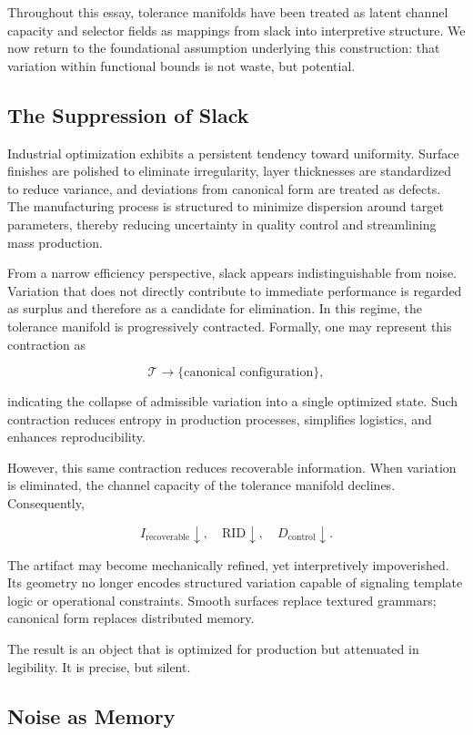 \documentclass[11pt]{article}
\begin{document}
Throughout this essay, tolerance manifolds have been treated as
latent channel capacity and selector fields as mappings from slack
into interpretive structure. We now return to the foundational
assumption underlying this construction: that variation within
functional bounds is not waste, but potential.

\subsection{The Suppression of Slack}

Industrial optimization exhibits a persistent tendency toward
uniformity. Surface finishes are polished to eliminate irregularity,
layer thicknesses are standardized to reduce variance, and deviations
from canonical form are treated as defects. The manufacturing process
is structured to minimize dispersion around target parameters, thereby
reducing uncertainty in quality control and streamlining mass
production.

From a narrow efficiency perspective, slack appears indistinguishable
from noise. Variation that does not directly contribute to immediate
performance is regarded as surplus and therefore as a candidate for
elimination. In this regime, the tolerance manifold is progressively
contracted. Formally, one may represent this contraction as

\[
\mathcal{T} \rightarrow \{ \text{canonical configuration} \},
\]

indicating the collapse of admissible variation into a single optimized
state. Such contraction reduces entropy in production processes,
simplifies logistics, and enhances reproducibility.

However, this same contraction reduces recoverable information. When
variation is eliminated, the channel capacity of the tolerance manifold
declines. Consequently,

\[
I_{\text{recoverable}} \downarrow,
\quad
\text{RID} \downarrow,
\quad
D_{\text{control}} \downarrow.
\]

The artifact may become mechanically refined, yet interpretively
impoverished. Its geometry no longer encodes structured variation
capable of signaling template logic or operational constraints. Smooth
surfaces replace textured grammars; canonical form replaces distributed
memory.

The result is an object that is optimized for production but
attenuated in legibility. It is precise, but silent.

\subsection{Noise as Memory}
\end{document}
